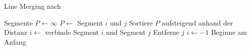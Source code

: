 \begin{algorithm}[!ht]
\caption{Line Merging nach \citeauthor{hirzer08}}
\label{alg:linemerging-hirzer}
\begin{algorithmic}[1]
	\Require Segmente
	\State $P \gets \infty$
						\State $P \gets$ Segment $i$ und $j$
					\EndIf
				\EndIf
			\EndIf
		\EndFor
		\State Sortiere $P$ aufsteigend anhand der Distanz
			\State $i \gets$ verbinde Segment $i$ und Segment $j$
			\State Entferne $j$
			\State $i \gets -1$
			\Comment Beginne am Anfang
		\EndFor
	\EndFor
\end{algorithmic}
\end{algorithm}
